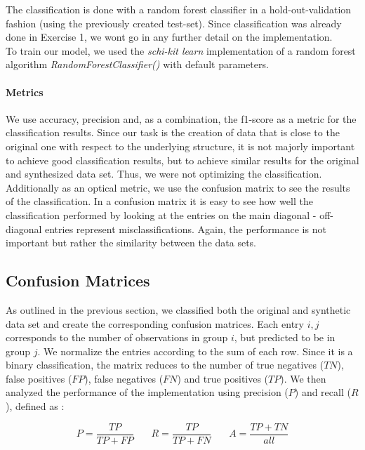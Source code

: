 \documentclass{article}
\begin{document}
The classification is done with a random forest classifier in a hold-out-validation fashion (using the previously created test-set). Since classification was already done in Exercise 1, we wont go in any further detail on the implementation. \\

To train our model, we used the \textit{schi-kit learn} implementation of a random forest algorithm \textit{RandomForestClassifier()} with default parameters.

\paragraph{Metrics}

We use accuracy, precision and, as a combination, the f1-score as a metric for the classification results. Since our task is the creation of data that is close to the original one with respect to the underlying structure, it is not majorly important to achieve good classification results, but to achieve similar results for the original and synthesized data set. Thus, we were not optimizing the classification. \\

Additionally as an optical metric, we use the confusion matrix to see the results of the classification. In a confusion matrix it is easy to see how well the classification performed by looking at the entries on the main diagonal - off-diagonal entries represent misclassifications. Again, the performance is not important but rather the similarity between the data sets.

\subsection{Confusion Matrices}
As outlined in the previous section, we classified both the original and synthetic data set and create the corresponding confusion matrices. Each entry $i,j$ corresponds to the number of observations in group $i$, but predicted to be in group $j$. We normalize the entries according to the sum of each row. Since it is a binary classification, the matrix reduces to the number of true negatives ($TN$), false positives ($FP$), false negatives ($FN$) and true positives ($TP$). We then analyzed the performance of the implementation using   precision ($P$) and recall ($R$), defined as :

\begin{equation}
P = \frac{TP}{TP + FP} \ \ \ \ \ \ \ \  R = \frac{TP}{TP + FN} \ \ \ \ \ \ \ \  A = \frac{TP + TN}{all}
\end{equation}
\end{document}
